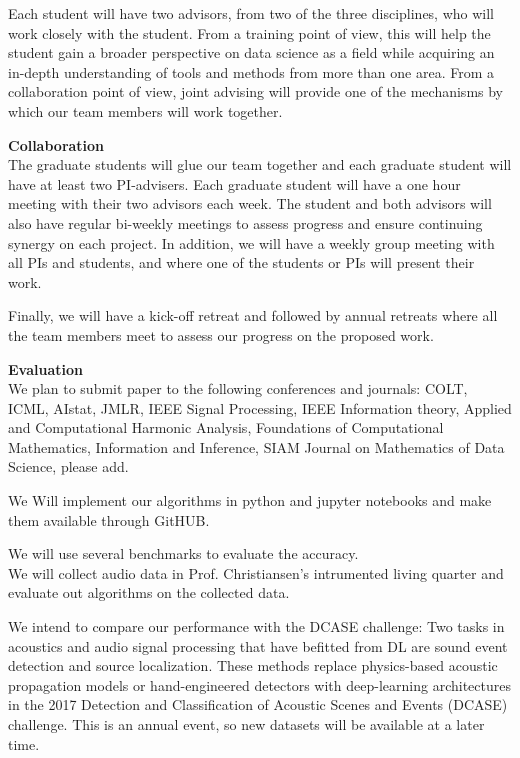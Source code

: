 \documentclass{article}
\begin{document}
Each student will have two advisors, from two of the three disciplines, who will work closely with the student. From a training point of view, this will help the student gain a broader perspective on data science as a field while acquiring an in-depth understanding of tools and methods from more than one area. From a collaboration point of view, joint advising will provide one of the mechanisms by which our team members will work together. 

{\bf Collaboration}\\ 
The graduate students will glue our team together and each graduate student will have at least two PI-advisers.  
Each graduate student will have a one hour meeting with their
two advisors each week. The student and both advisors will also have regular bi-weekly meetings to assess progress and ensure continuing synergy on each project.  In addition, we will have a weekly group meeting with all PIs and students, and where one of the students or PIs will present their work. 

Finally, we will have a kick-off retreat and followed by annual retreats where all the team members meet to assess our progress on the proposed work.

{\bf Evaluation}\\
We plan to submit paper to the following conferences and journals:
COLT, ICML, AIstat, JMLR, IEEE Signal Processing, IEEE Information
theory, Applied and Computational Harmonic Analysis, Foundations of Computational Mathematics, Information and Inference, SIAM Journal on Mathematics of Data Science, please add.

We Will implement our algorithms in python and jupyter notebooks and
make them available through GitHUB.

We will use several benchmarks to evaluate the accuracy.
\\
We will collect audio data in Prof. Christiansen's intrumented living
quarter and evaluate out algorithms on the collected data.

We intend to compare our performance with the DCASE challenge: Two tasks in acoustics and audio signal processing that have befitted from DL are sound event detection and source localization. These methods replace physics-based acoustic propagation models or hand-engineered detectors with deep-learning architectures in the 2017 Detection and Classification of Acoustic Scenes and Events (DCASE) challenge.\cite{mesaros2017dcase}
This is an annual event, so new datasets will be available at a later time.
\end{document}
